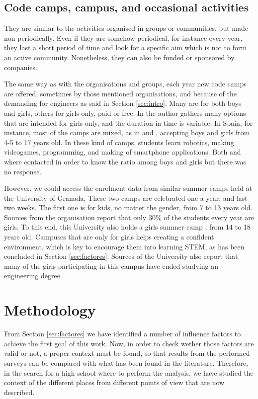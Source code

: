 \documentclass[journal,transmag]{IEEEtran}
\begin{document}
\subsection{Code camps, campus, and occasional activities}

They are similar to the activities organised in groups or communities, but made non-periodically. Even if they are somehow periodical, for instance every year, they last a short period of time and look for a specific aim which is not to form an active community. Nonetheless, they can also be funded or sponsored by companies. 

The same way as with the organisations and groups, each year new code camps are offered, sometimes by those mentioned organisations, and because of the demanding for engineers as said in Section \ref{sec:intro}. Many are for both boys and girls, others for girls only, paid or free. In \cite{lauren2015} the author gathers many options that are intended for girls only, and the duration in time is variable. In Spain, for instance, most of the camps are mixed, as in \cite{cmadrid:site} and \cite{cbcn:site}, accepting boys and girls from 4-5 to 17 years old. In these kind of camps, students learn robotics, making videogames, programming, and making of smartphone applications. Both  \cite{cmadrid:site} and \cite{cbcn:site} where contacted in order to know the ratio among boys and girls but there was no response.

However, we could access the enrolment data from similar summer camps held at the University of Granada. These two camps are celebrated one a year, and last two weeks. The first one \cite{cinfant:site} is for kids, no matter the gender, from 7 to 13 years old. Sources from the organisation report that only 30\% of the students every year are girls. To this end, this University also holds a girls summer camp \cite{cchicas:site}, from 14 to 18 years old. Campuses that are only for girls helps creating a confident environment, which is key to encourage them into learning STEM, as has been concluded in Section \ref{sec:factores}. Sources of the University also report that many of the girls participating in this campus have ended studying an engineering degree.

\section{Methodology}
\label{sec:metodologia}

From Section \ref{sec:factores} we have identified a number of influence factors to achieve the first goal of this work. Now, in order to check wether those factors are valid or not, a proper context must be found, so that results from the performed surveys can be compared with what has been found in the literature. Therefore, in the search for a high school where to perform the analysis, we have studied the context of the different places from different points of view that are now described.
\end{document}

